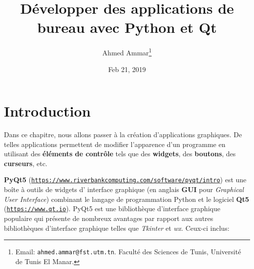 \documentclass[%
oneside,                 %
final,                   %
10pt,french]{article}
\begin{document}

\newcommand{\exercisesection}[1]{\subsection*{#1}}






\title{Développer des applications de bureau avec Python et Qt}


\author{Ahmed Ammar\footnote{Email: \texttt{ahmed.ammar@fst.utm.tn}. Faculté des Sciences de Tunis, Université de Tunis El Manar.}}


\date{Feb 21, 2019}
\maketitle

\tableofcontents


\vspace{1cm} %




\section{Introduction}
Dans ce chapitre, nous allons passer à la création d’applications graphiques. De telles applications permettent de modifier l'apparence d'un programme en utilisant des \textbf{éléments de contrôle} tels que des \textbf{widgets}, des \textbf{boutons}, des \textbf{curseurs}, etc.

\textbf{PyQt5} (\href{{https://www.riverbankcomputing.com/software/pyqt/intro}}{\nolinkurl{https://www.riverbankcomputing.com/software/pyqt/intro}}) est une boîte à outils de widgets d' interface graphique (en anglais \textbf{GUI} pour \emph{Graphical User Interface}) combinant le langage de programmation Python et le logiciel \textbf{Qt5} (\href{{https://www.qt.io}}{\nolinkurl{https://www.qt.io}}). PyQt5 est une bibliothèque d'interface graphique populaire qui présente de nombreux avantages par rapport aux autres bibliothèques d'interface graphique telles que \emph{Tkinter} et \emph{wx}. Ceux-ci inclus:
\end{document}
